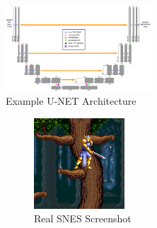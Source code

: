 \documentclass[10pt,twocolumn,letterpaper]{article}
\begin{document}
\begin{figure}[H]
   \centering
   \includegraphics[width=0.485\textwidth]{figures/unet.png}
   \caption{Example U-NET Architecture}
   \label{fig:unet}
\end{figure}
% 

\begin{figure}[H]
   \centering
   \begin{subfigure}[b]{0.225\textwidth}
      \includegraphics[width=\textwidth, height=0.9\textwidth]{figures/snes_to_nes/AV_Mahjong_Club_(J)_(Unl)_copy__ucc__8_real_B.png}
      \caption{Real SNES Screenshot}
      \label{fig:ss1a}
   \end{subfigure}
   \begin{subfigure}[b]{0.225\textwidth}

\end{subfigure}
\end{figure}
\end{document}
